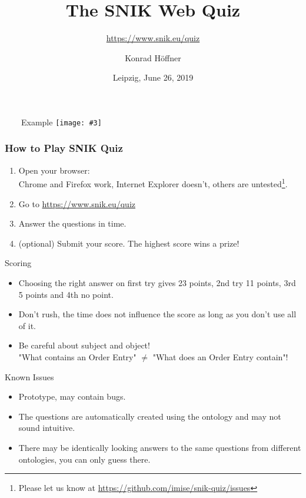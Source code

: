 \documentclass[aspectratio=1610,12pt]{beamer}
\author{Konrad Höffner}
\date{Leipzig, June 26, 2019}
\title{The SNIK Web Quiz}
\subtitle{\url{https://www.snik.eu/quiz}}
\newcommand{\imageslide}[4][]
{
\newgeometry{margin=0cm,top=1em}
\begin{frame}[plain]{~~~~#2}
\vspace{0.2em}
\centering\texttt{[image: \#3]}
\\#1
\note{#4}
\end{frame}
\restoregeometry
}
\begin{document}
\begin{frame}
\titlepage
\end{frame}

\imageslide{Example}{img/snik-quiz-screenshot.png}{}{}

\begin{frame}
\frametitle{How to Play SNIK Quiz}
\begin{enumerate}
\item Open your browser:\\ Chrome and Firefox work, Internet Explorer doesn't, others are untested\footnote{Please let us know at \url{https://github.com/imise/snik-quiz/issues}}.
\item Go to \url{https://www.snik.eu/quiz}
\item Answer the questions in time. 
\item (optional) Submit your score. The highest score wins a prize! 
\end{enumerate}
\end{frame}

\begin{frame}{Scoring}
\begin{itemize}
\item Choosing the right answer on first try gives 23 points, 2nd try 11 points, 3rd 5 points and 4th no point. 
\item Don't rush, the time does not influence the score as long as you don't use all of it.
\item Be careful about subject and object!\\"What contains an Order Entry" $\neq$ "What does an Order Entry contain"!
\end{itemize}
\end{frame}

\begin{frame}{Known Issues}
\begin{itemize}
\item Prototype, may contain bugs.
\item The questions are automatically created using the ontology and may not sound intuitive.
\item There may be identically looking answers to the same questions from different ontologies, you can only guess there.
\end{itemize}
\end{frame}
\end{document}

